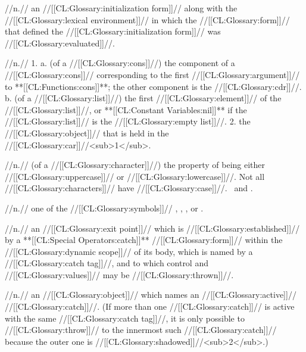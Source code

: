  //n.// an //[[CL:Glossary:initialization form]]// along with the //[[CL:Glossary:lexical environment]]// in which the //[[CL:Glossary:form]]// that defined the //[[CL:Glossary:initialization form]]// was //[[CL:Glossary:evaluated]]//. 

 //n.// 1. a. (of a //[[CL:Glossary:cons]]//) the component of a //[[CL:Glossary:cons]]// corresponding to the first //[[CL:Glossary:argument]]// to **[[CL:Functions:cons]]**; the other component is the //[[CL:Glossary:cdr]]//.  b. (of a //[[CL:Glossary:list]]//) the first //[[CL:Glossary:element]]// of the //[[CL:Glossary:list]]//, or **[[CL:Constant Variables:nil]]** if the //[[CL:Glossary:list]]// is the //[[CL:Glossary:empty list]]//. 2. the //[[CL:Glossary:object]]// that is held in the //[[CL:Glossary:car]]//<sub>1</sub>. 
 
 //n.// (of a //[[CL:Glossary:character]]//) the property of being either //[[CL:Glossary:uppercase]]// or //[[CL:Glossary:lowercase]]//. Not all //[[CL:Glossary:characters]]// have //[[CL:Glossary:case]]//.  \Seesection\CharactersWithCase\ and .

 //n.// one of the //[[CL:Glossary:symbols]]// , , , or .

 //n.// an //[[CL:Glossary:exit point]]// which is //[[CL:Glossary:established]]// by a **[[CL:Special Operators:catch]]** //[[CL:Glossary:form]]// within the //[[CL:Glossary:dynamic scope]]// of its body, which is named by a //[[CL:Glossary:catch tag]]//, and to which control and //[[CL:Glossary:values]]// may be //[[CL:Glossary:thrown]]//.

 //n.// an //[[CL:Glossary:object]]// which names an //[[CL:Glossary:active]]// //[[CL:Glossary:catch]]//. (If more than one //[[CL:Glossary:catch]]// is active with the same //[[CL:Glossary:catch tag]]//, it is only possible to //[[CL:Glossary:throw]]// to the innermost such //[[CL:Glossary:catch]]// because the outer one is //[[CL:Glossary:shadowed]]//<sub>2</sub>.)

